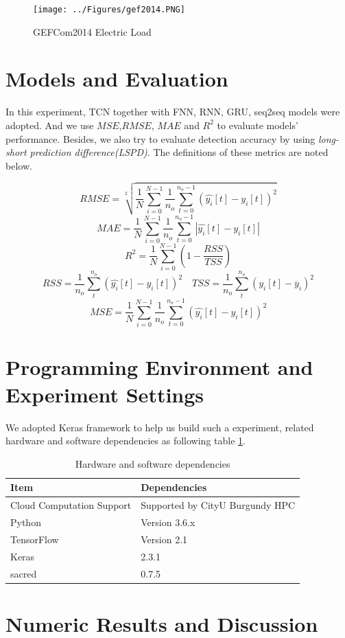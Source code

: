 \begin{figure}[H]
    \texttt{[image: ../Figures/gef2014.PNG]}
    \caption{GEFCom2014 Electric Load}
    \label{fig:gefc2014}
\end{figure}

\section{Models and Evaluation}
In this experiment, TCN together with FNN, RNN, GRU, seq2seq models were adopted. And we use $MSE$,$RMSE$, $MAE$ and $R^2$ to evaluate models' performance. Besides, we also try to evaluate detection accuracy by using \textit{long-short prediction difference(LSPD)}. The definitions of these metrics are noted below.

$$RMSE = \sqrt[2]{\frac{1}{N}\sum_{i=0}^{N-1}\frac{1}{n_o}\sum_{t=0}^{n_o-1}(\hat{y_i}[t]-y_i[t])^2} $$
$$MAE = \frac{1}{N}\sum_{i=0}^{N-1}\frac{1}{n_o}\sum_{t=0}^{n_o-1}|\hat{y_i}[t]-y_i[t]|$$
$$R^2 = \frac{1}{N}\sum_{i=0}^{N-1}(1- \frac{RSS}{TSS})$$
$$RSS=\frac{1}{n_o}\sum_{t}^{n_o}(\hat{y_i}[t]-y_i[t])^2 \quad TSS= \frac{1}{n_o}\sum_{t}^{n_o}(y_i[t] - \overline{y}_i)^2 $$
$$MSE = \frac{1}{N}\sum_{i=0}^{N-1}\frac{1}{n_o}\sum_{t=0}^{n_o-1}(\hat{y_i}[t]-y_i[t])^2$$


\section{Programming Environment and Experiment Settings}
We adopted Keras framework to help us build such a experiment, related hardware and software dependencies as following table \ref{tab:dependencies}. 

\begin{table}[H]
\centering
\caption{Hardware and software dependencies}
\begin{tabular}{l l}
\toprule
\textbf{Item} & \textbf{Dependencies}  \\
\midrule
Cloud Computation Support & Supported by CityU Burgundy HPC\\
Python & Version 3.6.x  \\
TensorFlow& Version 2.1 \\
Keras& 2.3.1 \\
sacred& 0.7.5 \\
\bottomrule
\end{tabular}
\label{tab:dependencies}
\end{table}

\section{Numeric Results and Discussion}

